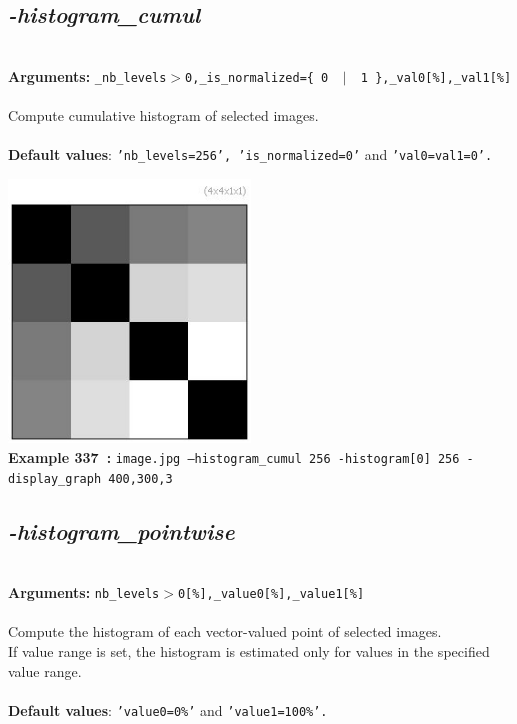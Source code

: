 \documentclass[a4paper,11pt,twoside]{book}
\begin{document}
\subsection{\emph{-histogram\_cumul} }\vspace*{-0.5em}
~\\\textbf{Arguments: } 
{\small \texttt{\_nb\_levels$>$0,\_is\_normalized=\{ 0 ~$|$~ 1 \},\_val0[\%],\_val1[\%]}}\\~\\
Compute cumulative histogram of selected images.
~\\~\\\textbf{Default values}: {\small \texttt{'nb\_levels=256', 'is\_normalized=0'} and \texttt{'val0=val1=0'.}}
\begin{center}\includegraphics[keepaspectratio=true,height=7cm,width=\textwidth]{img/gmic_def337.jpg}\\
{\footnotesize \textbf{Example 337~:} \texttt{image.jpg --histogram\_cumul 256 -histogram[0] 256 -display\_graph 400,300,3}}
\end{center}

\subsection{\emph{-histogram\_pointwise} }\vspace*{-0.5em}
~\\\textbf{Arguments: } 
{\small \texttt{nb\_levels$>$0[\%],\_value0[\%],\_value1[\%]}}\\~\\
Compute the histogram of each vector-valued point of selected images.
~\\If value range is set, the histogram is estimated only for values in the specified
value range.
~\\~\\\textbf{Default values}: {\small \texttt{'value0=0\%'} and \texttt{'value1=100\%'.}}
\end{document}
